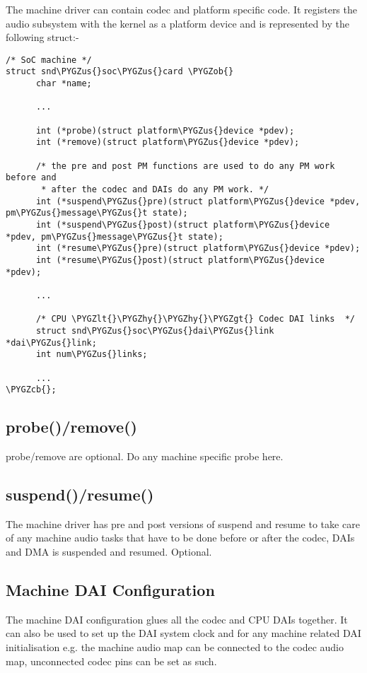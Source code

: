 \documentclass[a4paper,8pt,english]{sphinxmanual}
\def\PYGZus{\char`\_}
\def\PYGZob{\char`\{}
\def\PYGZcb{\char`\}}
\def\PYGZlt{\char`\<}
\def\PYGZgt{\char`\>}
\def\PYGZhy{\char`\-}
\begin{document}
The machine driver can contain codec and platform specific code. It registers
the audio subsystem with the kernel as a platform device and is represented by
the following struct:-

\begin{Verbatim}[commandchars=\\\{\}]
/* SoC machine */
struct snd\PYGZus{}soc\PYGZus{}card \PYGZob{}
      char *name;

      ...

      int (*probe)(struct platform\PYGZus{}device *pdev);
      int (*remove)(struct platform\PYGZus{}device *pdev);

      /* the pre and post PM functions are used to do any PM work before and
       * after the codec and DAIs do any PM work. */
      int (*suspend\PYGZus{}pre)(struct platform\PYGZus{}device *pdev, pm\PYGZus{}message\PYGZus{}t state);
      int (*suspend\PYGZus{}post)(struct platform\PYGZus{}device *pdev, pm\PYGZus{}message\PYGZus{}t state);
      int (*resume\PYGZus{}pre)(struct platform\PYGZus{}device *pdev);
      int (*resume\PYGZus{}post)(struct platform\PYGZus{}device *pdev);

      ...

      /* CPU \PYGZlt{}\PYGZhy{}\PYGZhy{}\PYGZgt{} Codec DAI links  */
      struct snd\PYGZus{}soc\PYGZus{}dai\PYGZus{}link *dai\PYGZus{}link;
      int num\PYGZus{}links;

      ...
\PYGZcb{};
\end{Verbatim}


\subsection{probe()/remove()}
\label{sound/soc/machine:probe-remove}
probe/remove are optional. Do any machine specific probe here.


\subsection{suspend()/resume()}
\label{sound/soc/machine:suspend-resume}
The machine driver has pre and post versions of suspend and resume to take care
of any machine audio tasks that have to be done before or after the codec, DAIs
and DMA is suspended and resumed. Optional.


\subsection{Machine DAI Configuration}
\label{sound/soc/machine:machine-dai-configuration}
The machine DAI configuration glues all the codec and CPU DAIs together. It can
also be used to set up the DAI system clock and for any machine related DAI
initialisation e.g. the machine audio map can be connected to the codec audio
map, unconnected codec pins can be set as such.
\end{document}
